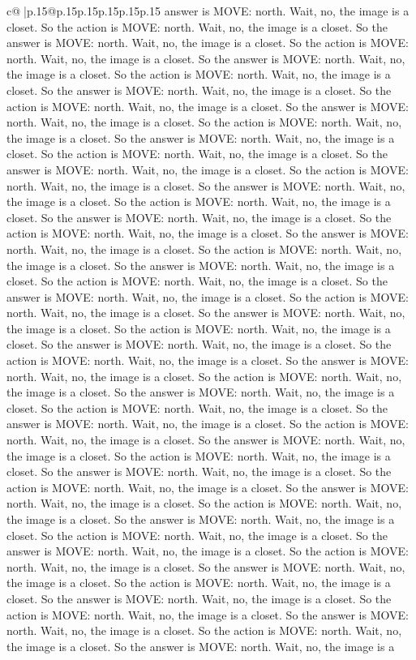 \documentclass{article}
\begin{document}
{\begin{supertabular}{c@{$\;$}|p{.15\linewidth}@{}p{.15\linewidth}p{.15\linewidth}p{.15\linewidth}p{.15\linewidth}p{.15\linewidth}}
{{{answer is MOVE: north. Wait, no, the image is a closet. So the action is MOVE: north. Wait, no, the image is a closet. So the answer is MOVE: north. Wait, no, the image is a closet. So the action is MOVE: north. Wait, no, the image is a closet. So the answer is MOVE: north. Wait, no, the image is a closet. So the action is MOVE: north. Wait, no, the image is a closet. So the answer is MOVE: north. Wait, no, the image is a closet. So the action is MOVE: north. Wait, no, the image is a closet. So the answer is MOVE: north. Wait, no, the image is a closet. So the action is MOVE: north. Wait, no, the image is a closet. So the answer is MOVE: north. Wait, no, the image is a closet. So the action is MOVE: north. Wait, no, the image is a closet. So the answer is MOVE: north. Wait, no, the image is a closet. So the action is MOVE: north. Wait, no, the image is a closet. So the answer is MOVE: north. Wait, no, the image is a closet. So the action is MOVE: north. Wait, no, the image is a closet. So the answer is MOVE: north. Wait, no, the image is a closet. So the action is MOVE: north. Wait, no, the image is a closet. So the answer is MOVE: north. Wait, no, the image is a closet. So the action is MOVE: north. Wait, no, the image is a closet. So the answer is MOVE: north. Wait, no, the image is a closet. So the action is MOVE: north. Wait, no, the image is a closet. So the answer is MOVE: north. Wait, no, the image is a closet. So the action is MOVE: north. Wait, no, the image is a closet. So the answer is MOVE: north. Wait, no, the image is a closet. So the action is MOVE: north. Wait, no, the image is a closet. So the answer is MOVE: north. Wait, no, the image is a closet. So the action is MOVE: north. Wait, no, the image is a closet. So the answer is MOVE: north. Wait, no, the image is a closet. So the action is MOVE: north. Wait, no, the image is a closet. So the answer is MOVE: north. Wait, no, the image is a closet. So the action is MOVE: north. Wait, no, the image is a closet. So the answer is MOVE: north. Wait, no, the image is a closet. So the action is MOVE: north. Wait, no, the image is a closet. So the answer is MOVE: north. Wait, no, the image is a closet. So the action is MOVE: north. Wait, no, the image is a closet. So the answer is MOVE: north. Wait, no, the image is a closet. So the action is MOVE: north. Wait, no, the image is a closet. So the answer is MOVE: north. Wait, no, the image is a closet. So the action is MOVE: north. Wait, no, the image is a closet. So the answer is MOVE: north. Wait, no, the image is a closet. So the action is MOVE: north. Wait, no, the image is a closet. So the answer is MOVE: north. Wait, no, the image is a closet. So the action is MOVE: north. Wait, no, the image is a closet. So the answer is MOVE: north. Wait, no, the image is a closet. So the action is MOVE: north. Wait, no, the image is a closet. So the answer is MOVE: north. Wait, no, the image is a closet. So the action is MOVE: north. Wait, no, the image is a closet. So the answer is MOVE: north. Wait, no, the image is a closet. So the action is MOVE: north. Wait, no, the image is a closet. So the answer is MOVE: north. Wait, no, the image is a }}}
\end{supertabular}}
\end{document}
